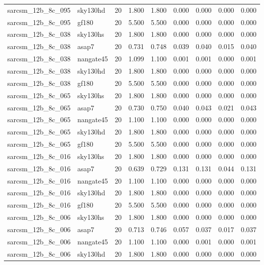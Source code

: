 \begin{tabular}{llrrrrrrr}
sarcsm\_12b\_8c\_095 & sky130hd & 20 & 1.800 & 1.800 & 0.000 & 0.000 & 0.000 & 0.000 \\
sarcsm\_12b\_8c\_095 & gf180 & 20 & 5.500 & 5.500 & 0.000 & 0.000 & 0.000 & 0.000 \\
sarcsm\_12b\_8c\_038 & sky130hs & 20 & 1.800 & 1.800 & 0.000 & 0.000 & 0.000 & 0.000 \\
sarcsm\_12b\_8c\_038 & asap7 & 20 & 0.731 & 0.748 & 0.039 & 0.040 & 0.015 & 0.040 \\
sarcsm\_12b\_8c\_038 & nangate45 & 20 & 1.099 & 1.100 & 0.001 & 0.001 & 0.000 & 0.001 \\
sarcsm\_12b\_8c\_038 & sky130hd & 20 & 1.800 & 1.800 & 0.000 & 0.000 & 0.000 & 0.000 \\
sarcsm\_12b\_8c\_038 & gf180 & 20 & 5.500 & 5.500 & 0.000 & 0.000 & 0.000 & 0.000 \\
sarcsm\_12b\_8c\_065 & sky130hs & 20 & 1.800 & 1.800 & 0.000 & 0.000 & 0.000 & 0.000 \\
sarcsm\_12b\_8c\_065 & asap7 & 20 & 0.730 & 0.750 & 0.040 & 0.043 & 0.021 & 0.043 \\
sarcsm\_12b\_8c\_065 & nangate45 & 20 & 1.100 & 1.100 & 0.000 & 0.000 & 0.000 & 0.000 \\
sarcsm\_12b\_8c\_065 & sky130hd & 20 & 1.800 & 1.800 & 0.000 & 0.000 & 0.000 & 0.000 \\
sarcsm\_12b\_8c\_065 & gf180 & 20 & 5.500 & 5.500 & 0.000 & 0.000 & 0.000 & 0.000 \\
sarcsm\_12b\_8c\_016 & sky130hs & 20 & 1.800 & 1.800 & 0.000 & 0.000 & 0.000 & 0.000 \\
sarcsm\_12b\_8c\_016 & asap7 & 20 & 0.639 & 0.729 & 0.131 & 0.131 & 0.044 & 0.131 \\
sarcsm\_12b\_8c\_016 & nangate45 & 20 & 1.100 & 1.100 & 0.000 & 0.000 & 0.000 & 0.000 \\
sarcsm\_12b\_8c\_016 & sky130hd & 20 & 1.800 & 1.800 & 0.000 & 0.000 & 0.000 & 0.000 \\
sarcsm\_12b\_8c\_016 & gf180 & 20 & 5.500 & 5.500 & 0.000 & 0.000 & 0.000 & 0.000 \\
sarcsm\_12b\_8c\_006 & sky130hs & 20 & 1.800 & 1.800 & 0.000 & 0.000 & 0.000 & 0.000 \\
sarcsm\_12b\_8c\_006 & asap7 & 20 & 0.713 & 0.746 & 0.057 & 0.037 & 0.017 & 0.037 \\
sarcsm\_12b\_8c\_006 & nangate45 & 20 & 1.100 & 1.100 & 0.000 & 0.001 & 0.000 & 0.001 \\
sarcsm\_12b\_8c\_006 & sky130hd & 20 & 1.800 & 1.800 & 0.000 & 0.000 & 0.000 & 0.000 \\

\end{tabular}
